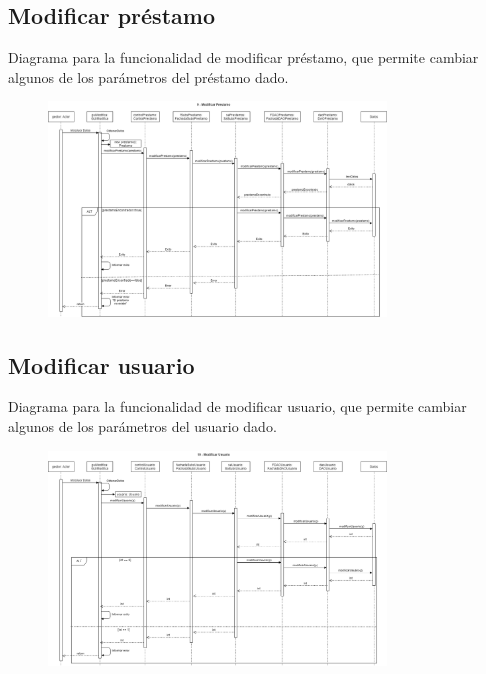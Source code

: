 \documentclass[12pt]{article}
\begin{document}
\subsection{Modificar préstamo}
Diagrama para la funcionalidad de modificar préstamo, que permite cambiar algunos de los parámetros del préstamo dado.
\begin{figure}[H]
    \centering
    \includegraphics[width=0.8\textwidth]{images/9-GestorModificaPrestamoFinal.png}
\end{figure}
\subsection{Modificar usuario}
Diagrama para la funcionalidad de modificar usuario, que permite cambiar algunos de los parámetros del usuario dado.
\begin{figure}[H]
    \centering
    \includegraphics[width=0.8\textwidth]{images/10._ModificarUsuario.png}
\end{figure}
\end{document}
